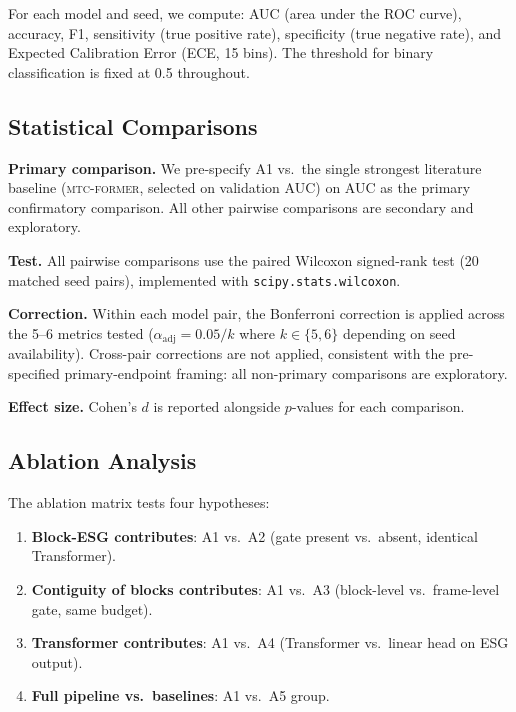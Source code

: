 \documentclass[a4paper,fleqn]{cas-sc}
\newcommand{\mtcf}{\textsc{mtc-former}\xspace}
\begin{document}
For each model and seed, we compute:
AUC (area under the ROC curve), accuracy, F1, sensitivity (true positive rate),
specificity (true negative rate), and Expected Calibration Error (ECE, 15 bins).
The threshold for binary classification is fixed at 0.5 throughout.

\subsection{Statistical Comparisons}
\label{sec:exp_stats}

\textbf{Primary comparison.}
We pre-specify A1 vs.\ the single strongest literature baseline (\mtcf,
selected on validation AUC) on AUC as the primary confirmatory comparison.
All other pairwise comparisons are secondary and exploratory.

\textbf{Test.}
All pairwise comparisons use the paired Wilcoxon signed-rank test (20 matched
seed pairs), implemented with \texttt{scipy.stats.wilcoxon}.

\textbf{Correction.}
Within each model pair, the Bonferroni correction is applied across the 5--6
metrics tested ($\alpha_{\text{adj}} = 0.05 / k$ where $k \in \{5,6\}$ depending
on seed availability).
Cross-pair corrections are not applied, consistent with the pre-specified
primary-endpoint framing: all non-primary comparisons are exploratory.

\textbf{Effect size.}
Cohen's $d$ is reported alongside $p$-values for each comparison.

\subsection{Ablation Analysis}
\label{sec:exp_ablation}

The ablation matrix tests four hypotheses:
\begin{enumerate}
  \item[(H1)] \textbf{Block-ESG contributes}: A1 vs.\ A2
        (gate present vs.\ absent, identical Transformer).
  \item[(H2)] \textbf{Contiguity of blocks contributes}: A1 vs.\ A3
        (block-level vs.\ frame-level gate, same budget).
  \item[(H3)] \textbf{Transformer contributes}: A1 vs.\ A4
        (Transformer vs.\ linear head on ESG output).
  \item[(H4)] \textbf{Full pipeline vs.\ baselines}: A1 vs.\ A5 group.
\end{enumerate}

\end{document}
